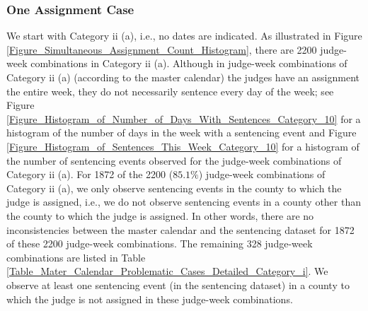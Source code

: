 \documentclass[11pt, oneside]{article}   	%
\theoremstyle{ModifiedStyle}
\newtheorem{note}{Note}
\begin{document}
\subsubsection{One Assignment Case} 
\label{Sec:Master_Calendar:Further_Analysis_of_Some_Assignments:Category_ii}
We start with Category ii (a), i.e., no dates are indicated. As illustrated in Figure \ref{Figure_Simultaneous_Assignment_Count_Histogram}, there are 2200 judge-week combinations in Category ii (a). Although in judge-week combinations of Category ii (a) (according to the master calendar) the judges have an assignment the entire week, they do not necessarily sentence every day of the week; see Figure \ref{Figure_Histogram_of_Number_of_Days_With_Sentences_Category_10} for a histogram of the number of days in the week with a sentencing event and Figure \ref{Figure_Histogram_of_Sentences_This_Week_Category_10} for a histogram of the number of sentencing events observed for the judge-week combinations of Category ii (a). For 1872 of the 2200 ($85.1\%$) judge-week combinations of Category ii (a), we only observe sentencing events in the county to which the judge is assigned, i.e., we do not observe sentencing events in a county other than the county to which the judge is assigned. In other words, there are no inconsistencies between the master calendar and the sentencing dataset for 1872 of these 2200 judge-week combinations. The remaining 328 judge-week combinations are listed in Table \ref{Table_Mater_Calendar_Problematic_Cases_Detailed_Category_i}. We observe at least one sentencing event (in the sentencing dataset) in a county to which the judge is not assigned in these judge-week combinations. %
\end{document}
